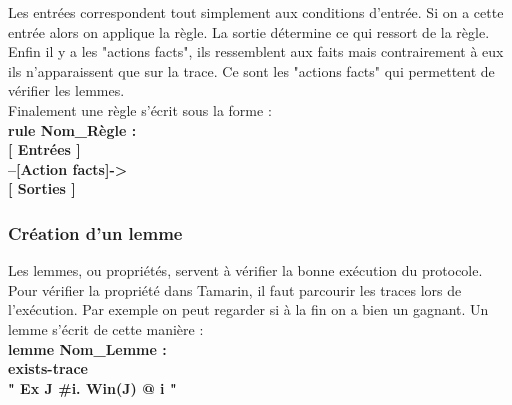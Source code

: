 \documentclass[conference]{IEEEtran}
\begin{document}
Les entrées correspondent tout simplement aux conditions d'entrée. Si on a cette entrée alors on applique la règle. La sortie détermine ce qui ressort de la règle. Enfin il y a les "actions facts", ils ressemblent aux faits mais contrairement à eux ils n'apparaissent que sur la trace. Ce sont les "actions facts" qui permettent de vérifier les lemmes. \\
Finalement une règle s'écrit sous la forme : \\
\textbf{rule Nom\_Règle : }\\
\textbf{ [ Entrées ]}\\
\textbf{ --[Action facts]->}\\
\textbf{ [ Sorties ]}\\

\subsubsection{Création d'un lemme} 
Les lemmes, ou propriétés, servent à vérifier la bonne exécution du protocole.\\
Pour vérifier la propriété dans Tamarin, il faut parcourir les traces lors de l'exécution. Par exemple on peut regarder si à la fin on a bien un gagnant. Un lemme s'écrit de cette manière :\\
\textbf{lemme Nom\_Lemme : }\\
\textbf{exists-trace}\\
\textbf{" Ex J #i. Win(J) @ i "}

\newpage
\end{document}
